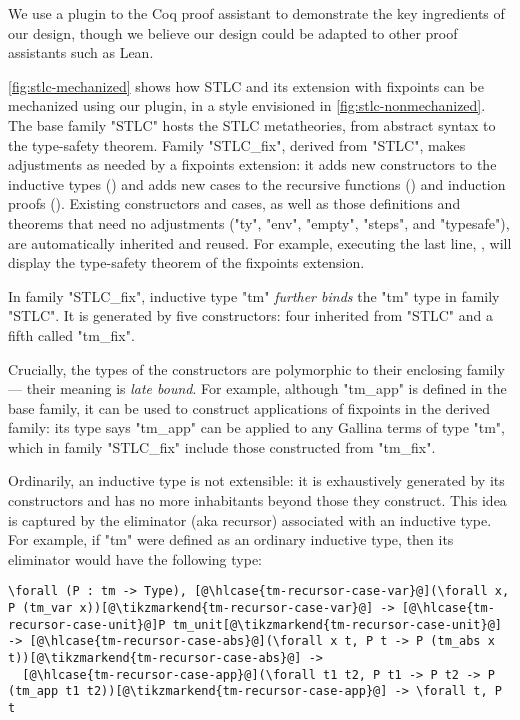 We use a plugin to the Coq proof assistant to demonstrate the key
ingredients of our design,
though we believe our design could be adapted to other proof assistants such as Lean.



\cref{fig:stlc-mechanized} shows how STLC and its extension with
fixpoints can be mechanized using our plugin, in a style envisioned in
\cref{fig:stlc-nonmechanized}.
The base family "STLC" hosts the STLC metatheories, from abstract syntax
to the type-safety theorem.
Family "STLC_fix", derived from "STLC", makes adjustments as needed by a fixpoints extension:
it adds new constructors to the inductive types () and
adds new cases to the recursive functions () and
induction proofs ().
Existing constructors and cases, as well as those definitions and
theorems that need no adjustments ("ty", "env", "empty", "steps", and
"typesafe"), are automatically inherited and reused.
For example, executing the last line, , will
display the type-safety theorem of the fixpoints extension.



In family "STLC_fix", inductive type "tm" \emph{further binds} the "tm" type
in family "STLC". It is generated by five constructors: four inherited from
"STLC" and a fifth called "tm_fix".

Crucially, the types of the constructors are polymorphic to their enclosing family---%
their meaning is \emph{late bound}.
For example, although "tm_app" is defined in the base family,
it can be used to construct applications of fixpoints in the derived family:
its type  says "tm_app" can be applied to any
Gallina terms of type "tm",
which in family "STLC_fix" include those constructed from "tm_fix".



Ordinarily, an inductive type is not extensible: it is exhaustively
generated by its constructors and has no more inhabitants beyond those
they construct.
This idea is captured by the eliminator (aka recursor) associated with
an inductive type.
For example, if "tm" were defined as an ordinary inductive type, then
its eliminator would have the following type:

\begingroup
\newcommand\hlcase[1]{\tikzmarkin[disable rounded corners=true,set fill color=yellow!18,set border color=yellow!18]{#1}(0.00,-0.05)(-0.00,0.20)}
\begin{lstlisting}[basicstyle=\fontsize{8.25}{9}\ttfamily]
\forall (P : tm -> Type), [@\hlcase{tm-recursor-case-var}@](\forall x, P (tm_var x))[@\tikzmarkend{tm-recursor-case-var}@] -> [@\hlcase{tm-recursor-case-unit}@]P tm_unit[@\tikzmarkend{tm-recursor-case-unit}@] -> [@\hlcase{tm-recursor-case-abs}@](\forall x t, P t -> P (tm_abs x t))[@\tikzmarkend{tm-recursor-case-abs}@] ->
  [@\hlcase{tm-recursor-case-app}@](\forall t1 t2, P t1 -> P t2 -> P (tm_app t1 t2))[@\tikzmarkend{tm-recursor-case-app}@] -> \forall t, P t
\end{lstlisting}
\endgroup

